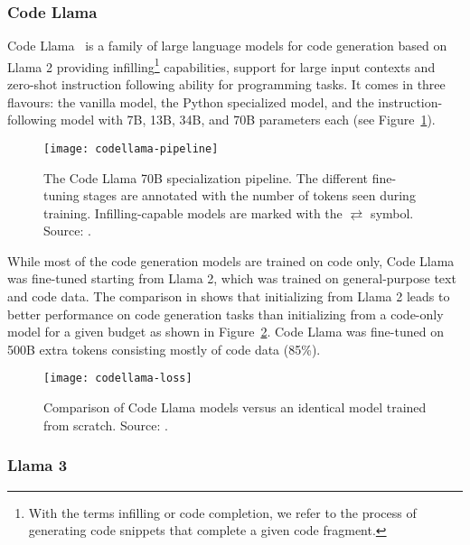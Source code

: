 \subsubsection{Code Llama}
\label{subsubsec:code-llama}

Code Llama~\cite{roziere2024codellamaopenfoundation} is a family of large language models for code generation based on Llama 2 providing infilling\footnote{With the terms infilling or code completion, we refer to the process of generating code snippets that complete a given code fragment.} capabilities, support
for large input contexts and zero-shot instruction following ability for programming tasks.
It comes in three flavours: the vanilla model, the Python specialized model, and the instruction-following model with 7B, 13B, 34B, and 70B parameters each (see Figure~\ref{fig:code-llama}).

\begin{figure}[h!]
	\centering
	\texttt{[image: codellama-pipeline]}
	\caption{The Code Llama 70B specialization pipeline. The different fine-tuning stages are annotated with the number of tokens seen during training. Infilling-capable models are marked with the $\rightleftarrows$ symbol. Source: \protect\textcite{roziere2024codellamaopenfoundation}.}
	\label{fig:code-llama}
\end{figure}

While most of the code generation models are trained on code only, Code Llama was fine-tuned starting from Llama 2, which was trained on general-purpose text and code data.
The comparison in \textcite{roziere2024codellamaopenfoundation} shows that initializing from Llama 2 leads to better performance on code generation tasks than initializing from a code-only model for a given budget as shown in Figure~\ref{fig:code-llama-comparison}.
Code Llama was fine-tuned on 500B extra tokens consisting mostly of code data (85\%).

\begin{figure}[ht!]
	\centering
	\texttt{[image: codellama-loss]}
	\caption{Comparison of Code Llama models versus an identical model trained from scratch. Source: \protect\textcite{roziere2024codellamaopenfoundation}.}
	\label{fig:code-llama-comparison}
\end{figure}

\subsubsection{Llama 3}
\label{subsubsec:llama-3}

